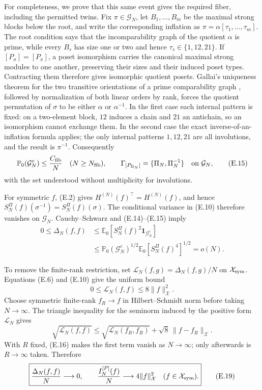 \documentclass[11pt]{article}
\begin{document}
For completeness, we prove that this same event gives the required fiber, including the permitted twins. Fix \(\pi\in\mathcal G_N\), let \(B_1,\ldots,B_m\) be the maximal strong blocks below the root, and write the corresponding inflation as \(\pi=\alpha[\tau_1,\ldots,\tau_m]\). The root condition says that the incomparability graph of the quotient \(\alpha\) is prime, while every \(B_s\) has size one or two and hence \(\tau_s\in\{1,12,21\}\). If \([P_\sigma]=[P_\pi]\), a poset isomorphism carries the canonical maximal strong modules to one another, preserving their sizes and their induced poset types. Contracting them therefore gives isomorphic quotient posets. Gallai's uniqueness theorem for the two transitive orientations of a prime comparability graph \citep{Gallai1967}, followed by normalization of both linear orders by rank, forces the quotient permutation of \(\sigma\) to be either \(\alpha\) or \(\alpha^{-1}\). In the first case each internal pattern is fixed: on a two-element block, \(12\) induces a chain and \(21\) an antichain, so an isomorphism cannot exchange them. In the second case the exact inverse-of-an-inflation formula applies; the only internal patterns \(1,12,21\) are all involutions, and the result is \(\pi^{-1}\). Consequently
\[
\mathbb P_0(\mathcal G_N^c)\le\frac{C_{\rm fib}}N
\quad(N\ge N_{\rm fib}),
\qquad
\Gamma_{[P_{\Pi_N}]}=\{\Pi_N,\Pi_N^{-1}\}
\quad\text{on }\mathcal G_N,
\tag{E.15}
\]
with the set understood without multiplicity for involutions.

For symmetric \(f\), (E.2) gives \(H^{(N)}(f)^\top=H^{(N)}(f)\), and hence \(S_N^\Pi(f)(\sigma^{-1})=S_N^\Pi(f)(\sigma)\). The conditional variance in (E.10) therefore vanishes on \(\mathcal G_N\). Cauchy--Schwarz and (E.14)--(E.15) imply \[ \begin{aligned} 0\le\Delta_N(f,f) &\le\mathbb E_0\!\left[S_N^\Pi(f)^2 \mathbf1_{\mathcal G_N^c}\right]\\ &\le\mathbb P_0(\mathcal G_N^c)^{1/2} \mathbb E_0[S_N^\Pi(f)^4]^{1/2} =o(N). \end{aligned} \tag{E.16} \]

To remove the finite-rank restriction, set \(\mathcal L_N(f,g)=\Delta_N(f,g)/N\) on \(\mathcal X_{\rm sym}\). Equations (E.6) and (E.10) give the uniform bound \[ 0\le\mathcal L_N(f,f)\le8\|f\|_{\mathcal X}^2. \tag{E.17} \] Choose symmetric finite-rank \(f_R\to f\) in Hilbert--Schmidt norm before taking \(N\to\infty\). The triangle inequality for the seminorm induced by the positive form \(\mathcal L_N\) gives \[ \sqrt{\mathcal L_N(f,f)} \le\sqrt{\mathcal L_N(f_R,f_R)} +\sqrt8\,\|f-f_R\|_{\mathcal X}. \tag{E.18} \] With \(R\) fixed, (E.16) makes the first term vanish as \(N\to\infty\); only afterwards is \(R\to\infty\) taken. Therefore \[ \boxed{ \frac{\Delta_N(f,f)}N\longrightarrow0, \qquad \frac{I_N^{[P]}(f)}N\longrightarrow4\|f\|_{\mathcal X}^2 \quad(f\in\mathcal X_{\rm sym}).} \tag{E.19} \]
\end{document}
